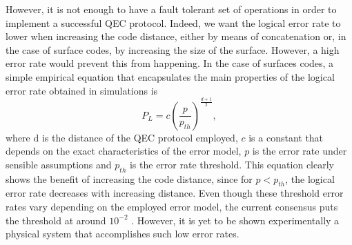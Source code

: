 However, it is not enough to have a fault tolerant set of operations in order to
implement a successful QEC protocol. Indeed, we want the logical error rate to
lower when increasing the code distance, either by means of concatenation or, in
the case of surface codes, by increasing the size of the surface. However, a high
error rate would prevent this from happening. In the case of surfaces codes, a
simple empirical equation that encapsulates the main properties of the logical
error rate obtained in simulations is
\cite{fowler12_surfac_codes}
\begin{equation}
  \label{eq:1}
  P_L = c\left(\frac{p}{p_{th}}\right)^{\frac{ d+1 }{2}},
\end{equation}
where d is the distance of the QEC protocol employed, $c$ is a constant that
depends on the exact characteristics of the error model, $p$ is the error rate
under sensible assumptions and $p_{th}$ is the error rate threshold. This
equation clearly shows the benefit of increasing the code distance, since for
$p<p_{th}$, the logical error rate decreases with increasing distance. Even
though these threshold error rates vary depending on the employed error model,
the current consensus puts the threshold at around $10^{-2}$ \cite{terhal15}
\cite{Versluis_2017}. However, it is yet to be shown experimentally a physical
system that accomplishes such low error rates.



